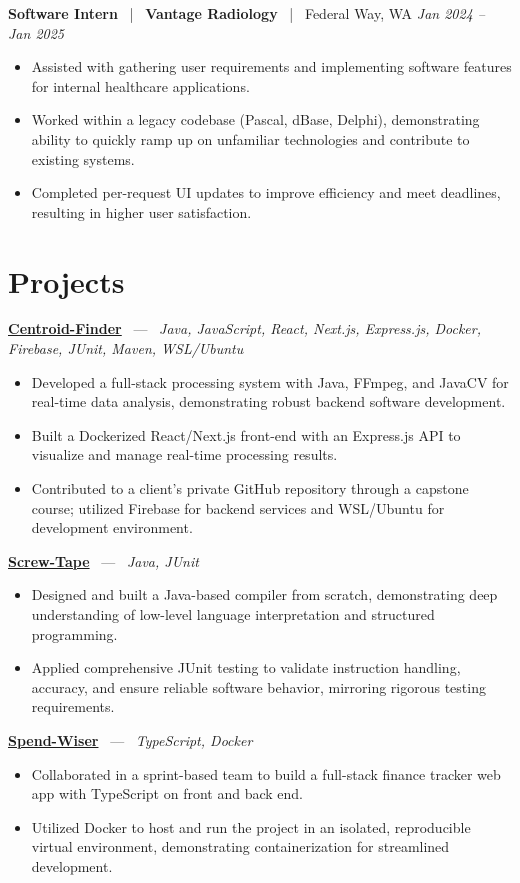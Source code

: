 \documentclass[10pt, letterpaper]{article}
\newcommand{\jobhead}[4]{%
  \vspace{3pt}%
  {\bfseries\color{dark}#1}%
  ~{\color{light}|}~%
  {\bfseries\color{navy}#2}%
  ~{\color{light}|}~%
  {\color{light}#3}%
  \hfill{\color{light}\small\textit{#4}}\\[-2pt]%
}
\newcommand{\projhead}[3]{%
  \vspace{3pt}%
  {\bfseries\color{dark}\href{#2}{#1}}%
  ~{\color{light}---}~%
  {\color{light}\small\textit{#3}}\\[-2pt]%
}
\begin{document}
\jobhead{Software Intern}{Vantage Radiology}{Federal Way, WA}{Jan 2024 – Jan 2025}
\begin{itemize}
  \item Assisted with gathering user requirements and implementing software features for internal healthcare applications.
  \item Worked within a legacy codebase (Pascal, dBase, Delphi), demonstrating ability to quickly ramp up on unfamiliar technologies and contribute to existing systems.
  \item Completed per-request UI updates to improve efficiency and meet deadlines, resulting in higher user satisfaction.
\end{itemize}

\section{Projects}

\projhead{Centroid-Finder}{https://github.com/xavierb117/centroid-finder}{Java, JavaScript, React, Next.js, Express.js, Docker, Firebase, JUnit, Maven, WSL/Ubuntu}
\begin{itemize}
  \item Developed a full-stack processing system with Java, FFmpeg, and JavaCV for real-time data analysis, demonstrating robust backend software development.
  \item Built a Dockerized React/Next.js front-end with an Express.js API to visualize and manage real-time processing results.
  \item Contributed to a client's private GitHub repository through a capstone course; utilized Firebase for backend services and WSL/Ubuntu for development environment.
\end{itemize}

\projhead{Screw-Tape}{https://github.com/timmyd4/screwtape}{Java, JUnit}
\begin{itemize}
  \item Designed and built a Java-based compiler from scratch, demonstrating deep understanding of low-level language interpretation and structured programming.
  \item Applied comprehensive JUnit testing to validate instruction handling, accuracy, and ensure reliable software behavior, mirroring rigorous testing requirements.
\end{itemize}

\projhead{Spend-Wiser}{https://github.com/JesseChum/w26-sdev372-spendwiser-finance-tracker}{TypeScript, Docker}
\begin{itemize}
  \item Collaborated in a sprint-based team to build a full-stack finance tracker web app with TypeScript on front and back end.
  \item Utilized Docker to host and run the project in an isolated, reproducible virtual environment, demonstrating containerization for streamlined development.
\end{itemize}
\end{document}
